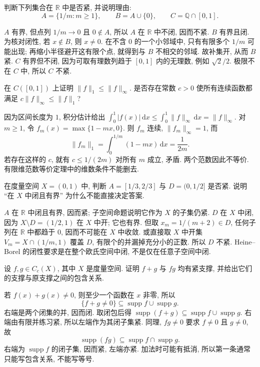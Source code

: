 \begin{exercise}
\label{ch:eucompact:ex-rational}
判断下列集合在 $\mathbb{R}$ 中是否紧, 并说明理由:
\[
 A=\{1/m:m\geq1\},\qquad
 B=A\cup\{0\},\qquad
 C=\mathbb{Q}\cap[0,1].
\]
\end{exercise}
\begin{solution}
$A$ 有界, 但点列 $1/m\to0$ 且 $0\notin A$, 所以 $A$ 在 $\mathbb{R}$ 中不闭, 因而不紧. $B$ 有界且闭. 为核对闭性, 若 $x\notin B$, 则 $x\ne0$. 在不含 $0$ 的一个小邻域中, 只有有限多个 $1/m$ 可能出现; 再缩小半径避开这有限个点, 就得到与 $B$ 不相交的邻域. 故补集开, 从而 $B$ 紧. $C$ 有界但不闭, 因为可取有理数列趋于 $[0,1]$ 内的无理数, 例如 $\sqrt2/2$. 极限不在 $C$ 中, 所以 $C$ 不紧.
\end{solution}

\begin{exercise}
\label{ch:eucompact:ex-norms-infinite}
在 $C([0,1])$ 上证明 $\|f\|_1\leq\|f\|_\infty$. 是否存在常数 $c>0$ 使所有连续函数都满足 $c\|f\|_\infty\leq\|f\|_1$?
\end{exercise}
\begin{solution}
因为区间长度为 $1$, 积分估计给出
$\int_0^1|f(x)|\,\mathrm{d}x\leq\int_0^1\|f\|_\infty\,\mathrm{d}x=\|f\|_\infty$.
对 $m\geq1$, 令 $f_m(x)=\max\{1-mx,0\}$. 则 $f_m$ 连续, $\|f_m\|_\infty=1$, 而
\[
 \|f_m\|_1=\int_0^{1/m}(1-mx)\,\mathrm{d}x=\frac1{2m}.
\]
若存在这样的 $c$, 就有 $c\leq1/(2m)$ 对所有 $m$ 成立, 矛盾. 两个范数因此不等价. 有限维范数等价定理中的维数条件不能删去.
\end{solution}

\begin{exercise}
\label{ch:eucompact:ex-subspace}
在度量空间 $X=(0,1)$ 中, 判断 $A=[1/3,2/3]$ 与 $D=(0,1/2]$ 是否紧. 说明 ``在 $X$ 中闭且有界'' 为什么不能直接决定答案.
\end{exercise}
\begin{solution}
$A$ 在 $\mathbb{R}$ 中闭且有界, 因而紧; 子空间命题说明它作为 $X$ 的子集仍紧. $D$ 在 $X$ 中闭, 因为 $X\setminus D=(1/2,1)$ 在 $X$ 中开; 它也有界. 但取 $x_m=1/(m+2)\in D$, 任何子列在 $\mathbb{R}$ 中都趋于 $0$, 因而不可能在 $X$ 中收敛. 或直接取 $X$ 中开集 $V_m=X\cap(1/m,1)$ 覆盖 $D$, 有限个的并漏掉充分小的正数. 所以 $D$ 不紧. Heine--Borel 的闭性要求是在整个欧氏空间中闭, 不是仅在任意子空间中闭.
\end{solution}

\begin{exercise}
\label{ch:eucompact:ex-support}
设 $f,g\in C_c(X)$, 其中 $X$ 是度量空间. 证明 $f+g$ 与 $fg$ 均有紧支撑, 并给出它们的支撑与原支撑之间的包含关系.
\end{exercise}
\begin{solution}
若 $f(x)+g(x)\ne0$, 则至少一个函数在 $x$ 非零, 所以
\[
 \{f+g\ne0\}\subseteq\operatorname{supp}f\cup\operatorname{supp}g.
\]
右端是两个闭集的并, 因而闭. 取闭包后得
$\operatorname{supp}(f+g)\subseteq\operatorname{supp}f\cup\operatorname{supp}g$.
右端由有限并练习紧, 所以左端作为其闭子集紧. 同理, $fg\ne0$ 要求 $f\ne0$ 且 $g\ne0$, 故
\[
 \operatorname{supp}(fg)\subseteq
 \operatorname{supp}f\cap\operatorname{supp}g.
\]
右端为 $\operatorname{supp}f$ 的闭子集, 因而紧, 左端亦紧. 加法时可能有抵消, 所以第一条通常只能写包含关系, 不能写等号.
\end{solution}
